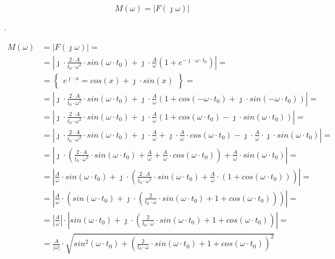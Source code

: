 \begin{task}
\begin{equation}
M\left(\omega\right) = \left|F(\jmath \omega)\right|
\end{equation}

.

\begin{align*}
M\left(\omega\right) &= \left|F(\jmath \omega)\right| =\\
&=\left| \jmath \cdot \frac{2 \cdot A}{t_0 \cdot \omega^2} \cdot  sin\left(\omega \cdot t_0\right) + \jmath \cdot \frac{A}{\omega} \left( 1+  e^{-\jmath \cdot \omega \cdot t_0} \right) \right| =\\
&=\begin{Bmatrix}
e^{\jmath \cdot x} = cos\left(x\right) + \jmath \cdot sin\left(x\right)
\end{Bmatrix}=\\
&=\left| \jmath \cdot \frac{2 \cdot A}{t_0 \cdot \omega^2} \cdot  sin\left(\omega \cdot t_0\right) + \jmath \cdot \frac{A}{\omega} \left( 1+  cos\left(- \omega \cdot t_0\right) + \jmath \cdot sin\left(- \omega \cdot t_0\right) \right) \right| =\\
&=\left| \jmath \cdot \frac{2 \cdot A}{t_0 \cdot \omega^2} \cdot  sin\left(\omega \cdot t_0\right) + \jmath \cdot \frac{A}{\omega} \left( 1+  cos\left(\omega \cdot t_0\right) - \jmath \cdot sin\left(\omega \cdot t_0\right) \right) \right| =\\
&=\left| \jmath \cdot \frac{2 \cdot A}{t_0 \cdot \omega^2} \cdot  sin\left(\omega \cdot t_0\right) + \jmath \cdot \frac{A}{\omega} + \jmath \cdot \frac{A}{\omega} \cdot  cos\left(\omega \cdot t_0\right) - \jmath \cdot \frac{A}{\omega} \cdot \jmath \cdot sin\left(\omega \cdot t_0\right) \right| =\\
&=\left| \jmath \cdot \left( \frac{2 \cdot A}{t_0 \cdot \omega^2} \cdot  sin\left(\omega \cdot t_0\right) + \frac{A}{\omega} + \frac{A}{\omega} \cdot  cos\left(\omega \cdot t_0\right)\right) + \frac{A}{\omega} \cdot sin\left(\omega \cdot t_0\right) \right| =\\
&=\left| \frac{A}{\omega} \cdot sin\left(\omega \cdot t_0\right) + \jmath \cdot \left( \frac{2 \cdot A}{t_0 \cdot \omega^2} \cdot  sin\left(\omega \cdot t_0\right) + \frac{A}{\omega} \cdot \left(1 + cos\left(\omega \cdot t_0\right)\right)\right) \right| =\\
&=\left| \frac{A}{\omega} \cdot \left( sin\left(\omega \cdot t_0\right) + \jmath \cdot \left( \frac{2}{t_0 \cdot \omega} \cdot  sin\left(\omega \cdot t_0\right) + 1 + cos\left(\omega \cdot t_0\right)\right)\right) \right| =\\
&=\left| \frac{A}{\omega}\right| \cdot \left| sin\left(\omega \cdot t_0\right) + \jmath \cdot \left( \frac{2}{t_0 \cdot \omega} \cdot  sin\left(\omega \cdot t_0\right) + 1 + cos\left(\omega \cdot t_0\right)\right) \right| =\\
&= \frac{A}{\left|\omega\right|} \cdot \sqrt{sin^2\left(\omega \cdot t_0\right) + \left( \frac{2}{t_0 \cdot \omega} \cdot  sin\left(\omega \cdot t_0\right) + 1 + cos\left(\omega \cdot t_0\right)\right)^2 }\\
\end{align*}


\end{task}
